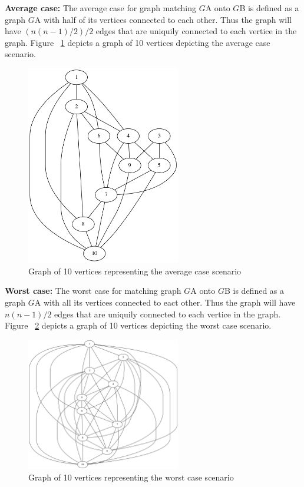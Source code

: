 \textbf{Average case:} The average case for graph matching $G${\tiny A} onto $G${\tiny B} is defined as a graph $G${\tiny A} with half of its vertices connected to each other. Thus the graph will have $(n(n-1) / 2) / 2$ edges that are uniquily connected to each vertice in the graph.
Figure ~\ref{fig:average} depicts a graph of 10 vertices depicting the average case scenario.
\begin{figure}[H]
  \begin{center}
      \includegraphics[width=0.6\textwidth]{average.png}
  \end{center}    
  \caption{Graph of 10 vertices representing the average case scenario}
  \label{fig:average}
\end{figure} 

\textbf{Worst case:} The worst case for matching graph $G${\tiny A} onto $G${\tiny B} is defined as a graph $G${\tiny A} with all its vertices connected to eact other. Thus the graph will have $n(n-1) / 2 $ edges that are uniquily connected to each vertice in the graph.
Figure ~\ref{fig:worst} depicts a graph of 10 vertices depicting the worst case scenario.
\begin{figure}[H]
  \begin{center}
      \includegraphics[width=0.6\textwidth]{worst.png}
  \end{center}    
  \caption{Graph of 10 vertices representing the worst case scenario}
  \label{fig:worst}
\end{figure} 
